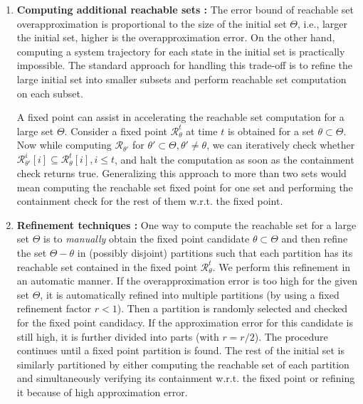 \begin{enumerate}[wide, labelindent=0pt]
\item \textbf{Computing additional reachable sets :} The error bound of reachable set overapproximation is proportional to the size of the initial set $\Theta$, i.e., larger the initial set, higher is the overapproximation error. 
%
On the other hand, computing a system trajectory for each state in the initial set is practically impossible. 
%
The standard approach for handling this trade-off is to refine the large initial set into smaller subsets and perform reachable set computation on each subset.

A fixed point can assist in accelerating the reachable set computation for a large set $\Theta$. Consider a fixed point $\mathcal{R}_{\theta}^t$ at time $t$ is obtained for a set $\theta \subset \Theta$. Now while computing $\mathcal{R}_{\theta'}$ for $\theta' \subset \Theta, \theta' \neq \theta$, we can iteratively check  whether $\mathcal{R}_{\theta'}^i[i] \subseteq \mathcal{R}_{\theta}^t[i], i \leq t$, and halt the computation as soon as the containment check returns true. 
%
%
Generalizing this approach to more than two sets would mean computing the reachable set fixed point for one set and performing the containment check for the rest of them w.r.t. the fixed point.

\item \textbf{Refinement techniques :} One way to compute the   reachable set for a large set $\Theta$ is to \emph{manually} obtain the fixed point candidate $\theta \subset \Theta$ and then refine the set $\Theta - \theta$ in (possibly disjoint) partitions  such that each partition has its reachable set contained in the fixed point $\mathcal{R}_{\theta}^t$.
%
We perform this refinement in an automatic manner. If the overapproximation error is too high for the given set $\Theta$, it is automatically refined into multiple partitions (by using a fixed refinement factor $r < 1$). 
%
Then a partition is randomly selected and checked for the fixed point candidacy. If the approximation error for this candidate is still high, it is further divided into parts (with $r = r/2$). The procedure continues until a fixed point partition is found. The rest of the initial set is similarly partitioned by either computing the reachable set of each partition and simultaneously verifying its containment w.r.t. the fixed point or refining it because of high approximation error.
\end{enumerate}

